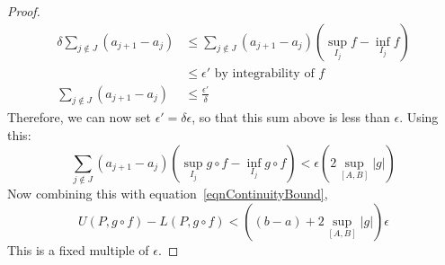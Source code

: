 \documentclass[../Main.tex]{subfiles}
\begin{document}
\begin{proof}
\begin{align*}
        \delta \sum_{j \notin J}(a_{j+1} - a_j) &\leq \sum_{j \notin J} (a_{j+1} - a_j) \left(\sup_{I_j} f - \inf_{I_j} f\right) \\
        &\leq \epsilon' \text{ by integrability of }f \\
        \sum_{j \notin J}(a_{j+1} - a_j) &\leq \frac{\epsilon'}{\delta}
    \end{align*}
    Therefore, we can now set $\epsilon' = \delta \epsilon$, so that this sum above is less than $\epsilon$. Using this:
    \begin{equation*}
        \sum_{j \notin J}(a_{j+1} - a_j) (\sup_{I_j} g \circ f - \inf_{I_j} g \circ f) <\epsilon(2\sup_{[A, B]} |g|)
    \end{equation*}
    Now combining this with equation~\ref{eqnContinuityBound},
    \begin{equation*}
        U(P, g \circ f) - L(P, g \circ f) < \left((b-a) + 2 \sup_{[A, B]} |g|\right) \epsilon
    \end{equation*}
    This is a fixed multiple of $\epsilon$.
\end{proof}
\end{document}
